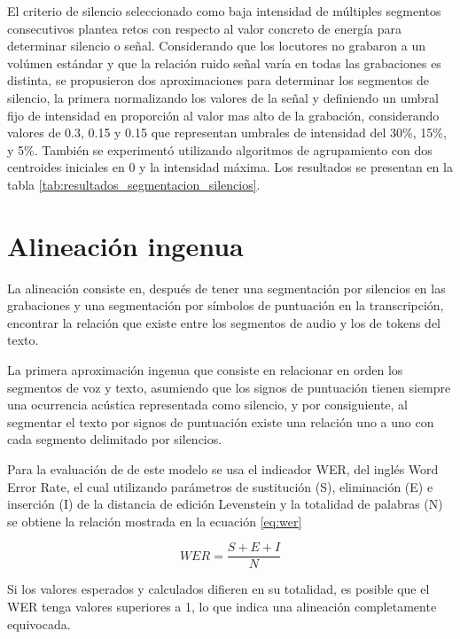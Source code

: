 El criterio de silencio seleccionado como baja intensidad de múltiples segmentos consecutivos plantea retos con respecto al valor concreto de energía para determinar silencio o señal. Considerando que los locutores no grabaron a un volúmen estándar y que la relación ruido señal varía en todas las grabaciones es distinta, se propusieron dos aproximaciones para determinar los segmentos de silencio, la primera normalizando los valores de la señal y definiendo un umbral fijo de intensidad en proporción al valor mas alto de la grabación, considerando valores de 0.3, 0.15 y 0.15 que representan umbrales de intensidad del 30\%, 15\%, y 5\%. También se experimentó utilizando algoritmos de agrupamiento con dos centroides iniciales en 0 y la intensidad máxima. Los resultados se presentan en la tabla \ref{tab:resultados_segmentacion_silencios}.




\section{Alineación ingenua}

La alineación consiste en, después de tener una segmentación por silencios en las grabaciones y una segmentación por símbolos de puntuación en la transcripción, encontrar la relación que existe entre los segmentos de audio y los de tokens del texto.

La primera aproximación ingenua que consiste en relacionar en orden los segmentos de voz y texto, asumiendo que los signos de puntuación tienen siempre una ocurrencia acústica representada como silencio, y por consiguiente, al segmentar el texto por signos de puntuación existe una relación uno a uno con cada segmento delimitado por silencios.

Para la evaluación de de este modelo se usa el indicador WER, del inglés Word Error Rate, el cual utilizando parámetros de sustitución (S), eliminación (E) e inserción (I) de la distancia de edición Levenstein \cite{Levenshtein_SPD66} y la totalidad de palabras (N) se obtiene la relación mostrada en la ecuación \ref{eq:wer}

\begin{equation}
    \label{eq:wer}
    WER = \frac{S + E + I}{N}
\end{equation}

Si los valores esperados y calculados difieren en su totalidad, es posible que el WER tenga valores superiores a 1, lo que indica una alineación completamente equivocada.

